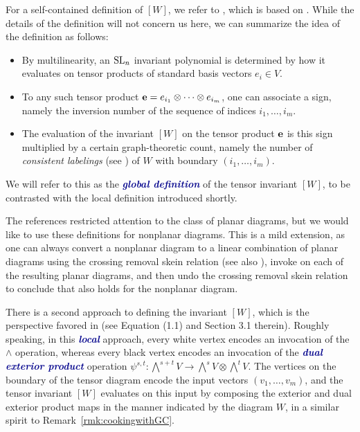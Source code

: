 \documentclass[ALCO, Unicode]{cedram}
\numberwithin{equation}{section}
\newcommand{\newword}[1]{\textcolor{darkblue}{\textbf{\emph{#1}}}}
\begin{document}
For a self-contained definition of $[W]$, we refer to \cite[Definition 4.1]{Fraser:2column}, which is based on \cite[Lemma 5.4]{Fraser.Lam.Le}. While the details of the definition will not concern us here, we can summarize the idea of the definition as follows:
\begin{itemize}
    \item By multilinearity, an ${\rm SL}_n$ invariant polynomial is determined by how it evaluates on tensor products of standard basis vectors $e_i \in V$.
    \item To any such tensor product ${\bf e} = e_{i_1} \otimes \cdots \otimes e_{i_m}$, one can associate a sign, namely the inversion number of the sequence of indices $i_1,\dots,i_m$. 
    \item The evaluation of the invariant $[W]$ on the tensor product ${\bf e}$ is this sign multiplied by a certain graph-theoretic count, namely the number of \emph{consistent labelings} (see \cite[Definition~3.1]{Fraser:2column}) of $W$ with boundary $(i_1,\dots,i_m)$.   
\end{itemize} 

We will refer to this as the \newword{global definition} of the tensor invariant $[W]$, to be contrasted with the local definition introduced shortly.

\begin{remark}
The references \cite{Fraser:2column, Fraser.Lam.Le} restricted attention to the class of planar diagrams, but we would like to use these definitions for nonplanar diagrams. This is a mild extension, as one can always convert a nonplanar diagram to a linear combination of planar diagrams using the crossing removal skein relation \cite[Corollary 6.2.3]{Cautis.Kamnitzer.Morrison} (see also \cite[Equation (34)]{Fraser.Pylyavskyy}), invoke \cite[Lemma 5.4]{Fraser.Lam.Le} on each of the resulting planar diagrams, and then undo the crossing removal skein relation to conclude that \cite[Lemma 5.4]{Fraser.Lam.Le} also holds for the nonplanar diagram.
\end{remark}

There is a second approach to defining the invariant $[W]$, which is the perspective favored in \cite{Cautis.Kamnitzer.Morrison} (see \eg Equation (1.1) and Section 3.1 therein). Roughly speaking, in this \newword{local} approach, every white vertex encodes an invocation of the $\wedge$ operation, whereas every black vertex encodes an invocation of the \newword{dual exterior product} operation $\psi^{s,t} \colon \bigwedge^{s+t}V \to \bigwedge^s V \otimes \bigwedge^tV$. The vertices on the boundary of the tensor diagram encode the input vectors $(v_1,\dots,v_m)$, and the tensor invariant $[W]$ evaluates on this input by composing the exterior and dual exterior product maps in the manner indicated by the diagram $W$, in a similar spirit to Remark~\ref{rmk:cookingwithGC}. 
\end{document}
